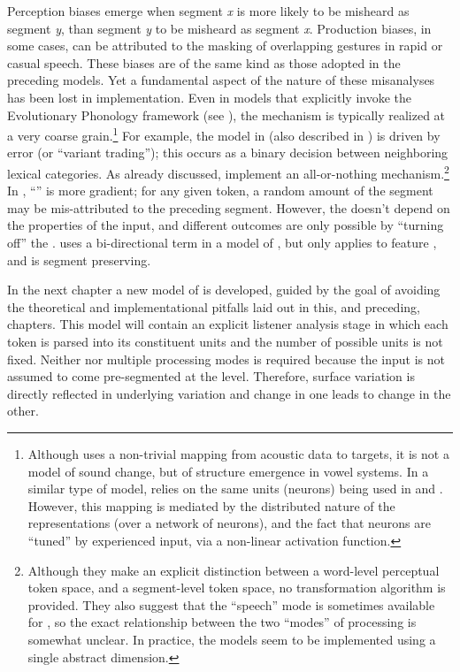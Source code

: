Perception biases emerge when segment \emph{x} is more likely to be
misheard as segment \emph{y}, than segment \emph{y} to be misheard
as segment \emph{x}. Production biases, in some cases, can be attributed
to the masking of overlapping  gestures in rapid or casual
speech. These biases are of the same kind as those adopted in the
preceding models. Yet a fundamental aspect of the nature of these
misanalyses has been lost in implementation. Even in models that explicitly
invoke the Evolutionary Phonology framework (see \citealt{Blevins2004}),
the mechanism is typically realized at a very coarse grain.\footnote{Although \citet{Boer2000} uses a non-trivial mapping from acoustic
data to  targets, it is not a model of sound change, but
of structure emergence in vowel systems. In a similar type of model,
\citet{oudeyer2006self} relies on the same units (neurons) being
used in  and . However, this mapping is mediated
by the distributed nature of the representations (over a network of
neurons), and the fact that neurons are ``tuned'' by experienced input,
via a non-linear activation function. } For example, the model in \citet{wedel2017category} (also described
in \citealt{Blevins2009}) is driven by  error (or “variant
trading”); this occurs as a binary decision between neighboring
lexical categories. As already discussed, \citet{Garrett2013} implement
an all-or-nothing  mechanism.\footnote{Although they make an explicit distinction between a word-level perceptual
token space, and a segment-level  token space, no transformation
algorithm is provided. They also suggest that the  ``speech''
mode is sometimes available for , so the exact relationship
between the two ``modes'' of processing is somewhat unclear. In practice,
the models seem to be implemented using a single abstract 
dimension.} In \citet{Kirby2014}, ``'' is more gradient; for any given
token, a random amount of the  segment may be mis-attributed
to the preceding segment. However, the  doesn't depend on
the  properties of the input, and different outcomes are only
possible by ``turning off'' the . \citet{morley2014implications}
uses a bi-directional  term in a model of ,
but  only applies to feature , and is segment
preserving. 

In the next chapter a new model of  is developed,\largerpage
guided by the goal of avoiding the theoretical and implementational
pitfalls laid out in this, and preceding, chapters. This model will
contain an explicit listener analysis stage in which each token is parsed into its 
constituent units and the number of possible units is not fixed. Neither  
nor multiple processing modes is required because the input is not assumed to come pre-segmented 
at the  level. Therefore, surface variation is directly reflected in underlying 
variation and change in one leads to change in the other.
